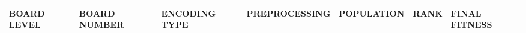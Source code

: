 \begin{tabular}{}
\hline
 BOARD LEVEL   & BOARD NUMBER   & ENCODING TYPE   & PREPROCESSING   & POPULATION   & RANK   & FINAL FITNESS   \\
\hline
\hline
\end{tabular}